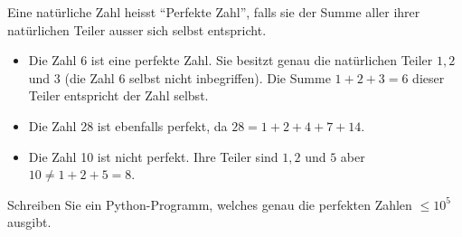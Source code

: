 \begin{mychallenge}
	Eine natürliche Zahl heisst ``Perfekte Zahl'', falls sie der Summe aller ihrer natürlichen Teiler ausser sich selbst entspricht.

	\begin{itemize}
		\item Die Zahl 6 ist eine perfekte Zahl. Sie besitzt genau die natürlichen Teiler $1, 2$ und $3$ (die Zahl $6$ selbst nicht inbegriffen). Die Summe $1 + 2 + 3 = 6$ dieser Teiler entspricht der Zahl selbst.
		\item Die Zahl 28 ist ebenfalls perfekt, da $28 = 1 + 2 + 4 + 7 + 14$.
		\item Die Zahl 10 ist nicht perfekt. Ihre Teiler sind $1, 2$ und $5$ aber $10 \neq 1 + 2 + 5 = 8$.
	\end{itemize}

	Schreiben Sie ein Python-Programm, welches genau die perfekten Zahlen $\leq 10^5$ ausgibt.
	\begin{myanswer}
		
	\end{myanswer}
\end{mychallenge}

